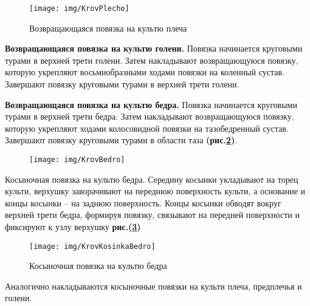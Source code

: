 \documentclass[12pt,a4paper]{report}
\begin{document}
\begin{figure}[h!]
\centering
\texttt{[image: img/KrovPlecho]}
\caption[]{Возвращающаяся повязка на культю плеча}
\label{fig:KrovPlecho}
\end{figure}

\textbf{Возвращающаяся повязка на культю голени.} Повязка начинается круговыми турами в верхней трети голени. Затем накладывают возвращающуюся повязку, которую укрепляют восьмиобразными ходами повязки на коленный сустав. Завершают повязку круговыми турами в верхней трети голени.

\textbf{Возвращающаяся повязка на культю бедра.} Повязка начинается круговыми турами в верхней трети бедра. Затем накладывают возвращающуюся повязку, которую укрепляют ходами колосовидной повязки на тазобедренный сустав. Завершают повязку круговыми турами в области таза\textbf{ (рис.\ref{fig:KrovBedro})}.

\begin{figure}[h]
\centering
\texttt{[image: img/KrovBedro]}
\caption[Возвращающаяся повязка на культю бедра]{}
\label{fig:KrovBedro}
\end{figure}

Косыночная повязка на культю бедра. Середину косынки укладывают на торец культи, верхушку заворачивают на переднюю поверхность культи, а основание и концы косынки – на заднюю поверхность. Концы косынки обводят вокруг верхней трети бедра, формируя повязку, связывают на передней поверхности и фиксируют к узлу верхушку \textbf{рис.(\ref{fig:KrovKosinkaBedro})}

\begin{figure}[h!]
\centering
\texttt{[image: img/KrovKosinkaBedro]}
\caption[]{Косыночная повязка на культю бедра}
\label{fig:KrovKosinkaBedro}
\end{figure}

Аналогично накладываются косыночные повязки на культи плеча, предплечья и голени.
\\
\end{document}
